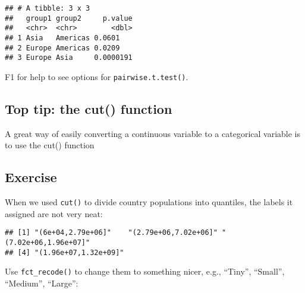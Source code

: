 \documentclass[]{book}
\makeatletter
\newenvironment{Shaded}{\begin{snugshade}}{\end{snugshade}}
\newcommand{\KeywordTok}[1]{\textcolor[rgb]{0.13,0.29,0.53}{\textbf{#1}}}
\newcommand{\DataTypeTok}[1]{\textcolor[rgb]{0.13,0.29,0.53}{#1}}
\newcommand{\StringTok}[1]{\textcolor[rgb]{0.31,0.60,0.02}{#1}}
\newcommand{\OperatorTok}[1]{\textcolor[rgb]{0.81,0.36,0.00}{\textbf{#1}}}
\newcommand{\NormalTok}[1]{#1}
\newenvironment{kframe}{%
\medskip{}
\setlength{\fboxsep}{.8em}
 \def\at@end@of@kframe{}%
 \ifinner\ifhmode%
  \def\at@end@of@kframe{\end{minipage}}%
  \begin{minipage}{\columnwidth}%
 \fi\fi%
 \def\FrameCommand##1{\hskip\@totalleftmargin \hskip-\fboxsep
 \colorbox{shadecolor}{##1}\hskip-\fboxsep
     \hskip-\linewidth \hskip-\@totalleftmargin \hskip\columnwidth}%
 \MakeFramed {\advance\hsize-\width
   \@totalleftmargin\z@ \linewidth\hsize
   \@setminipage}}%
 {\par\unskip\endMakeFramed%
 \at@end@of@kframe}
\renewenvironment{Shaded}{\begin{kframe}}{\end{kframe}}
\theoremstyle{definition}
\theoremstyle{definition}
\theoremstyle{definition}
\theoremstyle{remark}
\makeatother
\begin{document}
\begin{verbatim}
## # A tibble: 3 x 3
##   group1 group2     p.value
##   <chr>  <chr>        <dbl>
## 1 Asia   Americas 0.0601   
## 2 Europe Americas 0.0209   
## 3 Europe Asia     0.0000191
\end{verbatim}

F1 for help to see options for \texttt{pairwise.t.test()}.

\subsection{Top tip: the cut() function}\label{top-tip-the-cut-function}

A great way of easily converting a continuous variable to a categorical
variable is to use the cut() function

\begin{Shaded}
\end{Shaded}

\subsection{Exercise}\label{exercise-33}

When we used \texttt{cut()} to divide country populations into
quantiles, the labels it assigned are not very neat:

\begin{Shaded}
\end{Shaded}

\begin{verbatim}
## [1] "(6e+04,2.79e+06]"    "(2.79e+06,7.02e+06]" "(7.02e+06,1.96e+07]"
## [4] "(1.96e+07,1.32e+09]"
\end{verbatim}

Use \texttt{fct\_recode()} to change them to something nicer, e.g.,
``Tiny'', ``Small'', ``Medium'', ``Large'':
\end{document}
